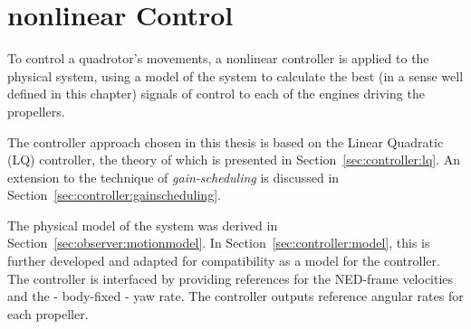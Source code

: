 \chapter{nonlinear Control}
\label{cha:controller}
    To control a quadrotor's movements, a nonlinear controller is applied to the
    physical system, using a model of the system to calculate the best
    (in a sense well defined in this chapter) signals of control to each
    of the engines driving the propellers.

    The controller approach chosen in this thesis is based on the Linear Quadratic (LQ)
    controller, the theory of which is presented in Section~\ref{sec:controller:lq}.
    An extension to the technique of \textit{gain-scheduling} is discussed
    in Section~\ref{sec:controller:gainscheduling}.

    The physical model of the system was derived in Section~\ref{sec:observer:motionmodel}.
    In Section~\ref{sec:controller:model}, this is further developed
    and adapted for compatibility as a model for the controller.
    The controller is interfaced by providing references
    for the NED-frame velocities and the - body-fixed - yaw rate.
    The controller outputs reference angular rates for each propeller.

    
    
    
